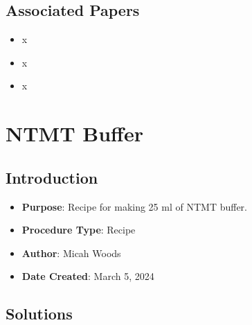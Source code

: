 \documentclass[
  letterpaper,
  DIV=11,
  numbers=noendperiod]{scrreprt}
\providecommand{\tightlist}{%
  \setlength{\itemsep}{0pt}\setlength{\parskip}{0pt}}\usepackage{longtable,booktabs,array}
\begin{document}
\hypertarget{associated-papers-75}{%
\section{Associated Papers}\label{associated-papers-75}}

\begin{itemize}
\tightlist
\item
  x
\item
  x
\item
  x
\end{itemize}

\hypertarget{sec-recipe-NTMT}{%
\chapter{NTMT Buffer}\label{sec-recipe-NTMT}}

\hypertarget{introduction-107}{%
\section{Introduction}\label{introduction-107}}

\begin{itemize}
\tightlist
\item
  \textbf{Purpose}: Recipe for making 25 ml of NTMT buffer.
\item
  \textbf{Procedure Type}: Recipe
\item
  \textbf{Author}: Micah Woods
\item
  \textbf{Date Created}: March 5, 2024
\end{itemize}

\hypertarget{solutions-93}{%
\section{Solutions}\label{solutions-93}}
\end{document}
